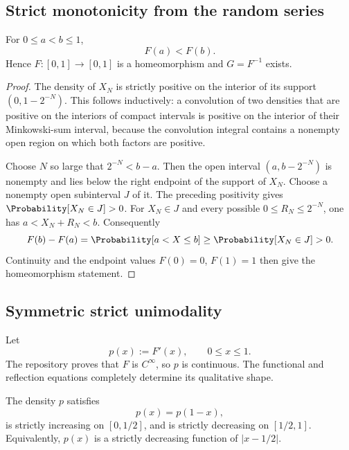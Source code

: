 \subsection{Strict monotonicity from the random series}

\begin{proposition}\label{co:prop:strict-increase}
For $0\le a<b\le1$,
\begin{equation}\label{co:eq:strict-increase}
 F(a)<F(b).
\end{equation}
Hence $F:[0,1]\to[0,1]$ is a homeomorphism and $G=F^{-1}$ exists.
\end{proposition}

\begin{proof}
The density of $X_N$ is strictly positive on the interior of its support
$(0,1-2^{-N})$.  This follows inductively: a convolution of two densities
that are positive on the interiors of compact intervals is positive on the
interior of their Minkowski-sum interval, because the convolution integral
contains a nonempty open region on which both factors are positive.

Choose $N$ so large that $2^{-N}<b-a$.  Then the open interval
$(a,b-2^{-N})$ is nonempty and lies below the right endpoint of the support of
$X_N$.  Choose a nonempty open subinterval $J$ of it.  The preceding positivity
gives $\Probability[X_N\in J]>0$.  For $X_N\in J$ and every possible
$0\le R_N\le2^{-N}$, one has $a<X_N+R_N<b$.  Consequently
\[
 F(b)-F(a)=\Probability[a<X\le b]\ge\Probability[X_N\in J]>0.
\]
Continuity and the endpoint values $F(0)=0$, $F(1)=1$ then give the
homeomorphism statement.
\end{proof}

\subsection{Symmetric strict unimodality}

Let
\begin{equation}\label{co:eq:density-p}
 p(x):=F'(x),\qquad 0\le x\le1.
\end{equation}
The repository proves that $F$ is $C^\infty$, so $p$ is continuous.  The
functional and reflection equations completely determine its qualitative
shape.

\begin{proposition}\label{co:prop:density-shape}
The density $p$ satisfies
\begin{equation}\label{co:eq:density-symmetry}
 p(x)=p(1-x),
\end{equation}
is strictly increasing on $[0,1/2]$, and is strictly decreasing on
$[1/2,1]$.  Equivalently, $p(x)$ is a strictly decreasing function of
$|x-1/2|$.
\end{proposition}


